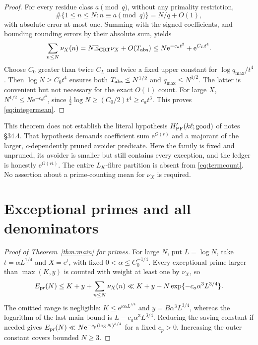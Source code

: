 \documentclass[10pt,reqno]{amsart}
\theoremstyle{remark}
\newcommand{\E}{\mathbb E}
\newcommand{\e}{\mathrm e}
\begin{document}
\begin{proof}
For every residue class $a\pmod q$, without any primality restriction,
\[
 \#\{1\leq n\leq N:n\equiv a\pmod q\}=N/q+O(1),
\]
with absolute error at most one.  Summing with the signed coefficients,
and bounding rounding errors by their absolute sum, yields
\begin{equation}\label{eq:transfer}
 \sum_{n\leq N}\nu_X(n)
 =N\E_{\rm CRT}\nu_X+O(T_{\rm abs})
 \leq N\e^{-c_at^3}+\e^{C_Lt^4}.
\end{equation}
Choose $C_0$ greater than twice $C_L$ and twice a fixed upper constant
for $\log q_{\max}/t^4$.  Then $\log N\geq C_0t^4$ ensures both
$T_{\rm abs}\leq N^{1/2}$ and $q_{\max}\leq N^{1/2}$.
The latter is convenient but not necessary for the exact $O(1)$ count.
For large $X$, $N^{1/2}\leq N\e^{-c_at^3}$, since
$\tfrac12\log N\geq(C_0/2)t^4\geq c_at^3$.
This proves \eqref{eq:integermean}.
\end{proof}

This theorem does not establish the literal hypothesis
$H_{\rm PF}'(k\ell;{\rm good})$ of notes \S34.4.  That hypothesis demands
coefficient sum $\e^{O(r)}$ and a majorant of the larger,
$c$-dependently pruned avoider predicate.  Here the family is fixed and
unpruned, its avoider is smaller but still contains every exception, and
the ledger is honestly $\e^{O(rt)}$.  The entire $L_K$-fibre partition
is absent from \eqref{eq:termcount}.  No assertion about a prime-counting
mean for $\nu_X$ is required.

\section{Exceptional primes and all denominators}\label{sec:all}
\begin{proof}[Proof of Theorem~\ref{thm:main} for primes]
For large $N$, put $L=\log N$, take
$t=\alpha L^{1/4}$ and $X=\e^t$, with fixed
$0<\alpha\leq C_0^{-1/4}$.  Every exceptional prime larger than
$\max(K,y)$ is counted with weight at least one by $\nu_X$, so
\[
 E_{\rm pr}(N)\leq K+y+\sum_{n\leq N}\nu_X(n)
 \ll K+y+N\exp\{-c_a\alpha^3L^{3/4}\}.
\]
The omitted range is negligible: $K\leq\e^{\kappa\alpha L^{1/4}}$ and
$y=B\alpha^3L^{3/4}$, whereas the logarithm of the last main bound is
$L-c_a\alpha^3L^{3/4}$.  Reducing the saving constant if needed gives
$E_{\rm pr}(N)\ll N\e^{-c_p(\log N)^{3/4}}$ for a fixed $c_p>0$.
Increasing the outer constant covers bounded $N\geq3$.
\end{proof}
\end{document}
